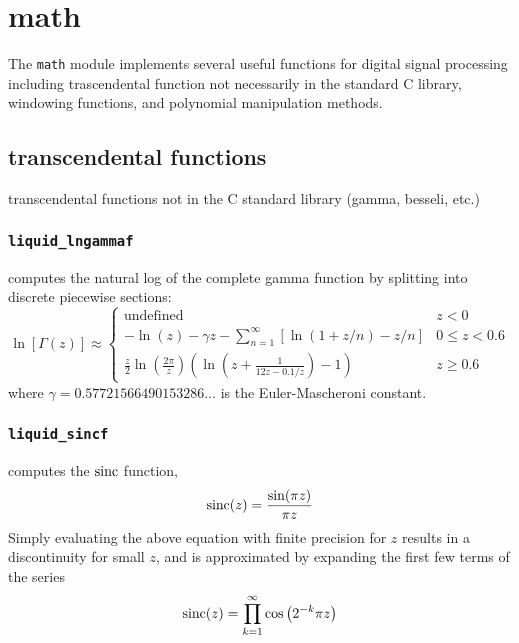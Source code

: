 % 
%

\newpage
\section{math}
\label{module:math}
The {\tt math} module implements several useful functions for digital
signal processing including trascendental function not necessarily in
the standard C library,
windowing functions,
and polynomial manipulation methods.

\subsection{transcendental functions}
\label{module:math:transcendentals}
transcendental functions not in the C standard library (gamma, besseli, etc.)


\subsubsection{{\tt liquid\_lngammaf}}
\label{module:math:transcendentals:lngamma}
    computes the natural log of the complete gamma function by splitting into
    discrete piecewise sections:
\[
    \ln\left[ \Gamma(z) \right] \approx
    \begin{cases}
        \text{undefined}
        & z < 0 \\
        -\ln(z) - \gamma z - \sum_{n=1}^{\infty} {
            \left[ \ln(1 + z/n) -z/n\right]
        }
        & 0 \le z < 0.6 \\
        \frac{z}{2} \ln\left( \frac{2\pi}{z} \right)
        \left(
            \ln\left(z + \frac{1}{12 z - 0.1/z} \right) - 1
        \right)
        & z \ge 0.6
    \end{cases}
\]
where $\gamma=0.57721566490153286\ldots$ is the Euler-Mascheroni constant.

\subsubsection{{\tt liquid\_sincf}}
\label{module:math:transcendentals:sinc}
    computes the $\textup{sinc}$ function,
\[
    \textup{sinc}(z) = \frac{\sin(\pi z)}{\pi z}
\]
Simply evaluating the above equation with finite precision for $z$ results in
a discontinuity for small $z$, and is approximated by expanding the first few
terms of the series
\[
    \textup{sinc}(z) = \prod_{k=1}^{\infty}{ \cos\left( 2^{-k} \pi z \right) }
\]

